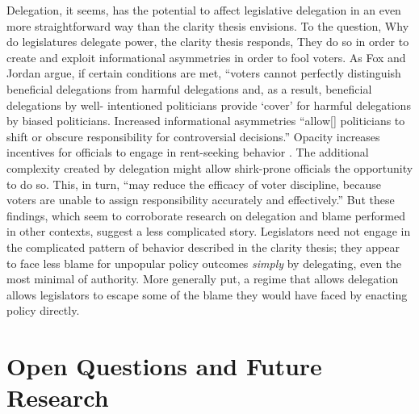 \documentclass{article}
\begin{document}
Delegation, it seems, has the potential to affect legislative delegation in an even more straightforward way than the clarity thesis envisions. To the question, Why do legislatures delegate power, the clarity thesis responds, They do so in order to create and exploit informational asymmetries in order to fool voters. As Fox and Jordan argue, if certain conditions are met, ``voters cannot perfectly distinguish beneficial delegations from harmful delegations and, as a result, beneficial delegations by well- intentioned politicians provide `cover' for harmful delegations by biased politicians.  \citep[p. 844]{Fox2011} Increased informational asymmetries ``allow[] politicians to shift or obscure responsibility for controversial decisions.'' \citep[p. 145]{Nzelibe2010} Opacity increases incentives for officials to engage in rent-seeking behavior \citep{Mesquita.draft}. The additional complexity created by delegation might allow shirk-prone officials the opportunity to do so. This, in turn, ``may reduce the efficacy of voter discipline, because voters are unable to assign responsibility accurately and effectively.'' \citep[p. 145]{Nzelibe2010} But these findings, which seem to corroborate research on delegation and blame performed in other contexts, suggest a less complicated story. Legislators need not engage in the complicated pattern of behavior described in the clarity thesis; they appear to face less blame for unpopular policy outcomes \emph{simply} by delegating, even the most minimal of authority. More generally put, a regime that allows delegation allows legislators to escape some of the blame they would have faced by enacting policy directly.

\section{Open Questions and Future Research}
\end{document}
